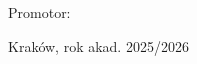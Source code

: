 \vspace{0.5cm}

\begin{center}
\fontsize{14pt}{16pt}\selectfont
\begin{minipage}{0.86\textwidth}
\centering
\@titlePL

\vspace{0.35cm}

\@titleEN{}
\end{minipage}
\end{center}

\vfill

\begin{center}
\fontsize{14pt}{16pt}\selectfont
Promotor:\\
\textbf{\@supervisor}
\end{center}

\vspace{0.8cm}

\begin{center}
\fontsize{18pt}{20pt}\selectfont
Kraków, rok akad. 2025/2026
\end{center}
\clearpage
\endgroup
\makeatother
